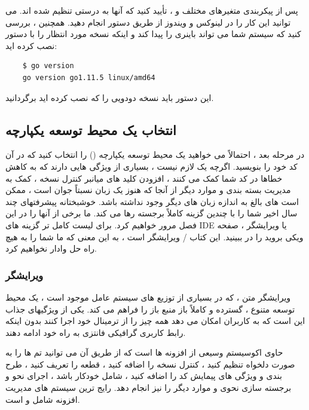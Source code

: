 \documentclass[12pt]{book}
\begin{document}
پس از پیکربندی متغیرهای مختلف  و  ، تأیید کنید که آنها به درستی تنظیم شده اند.
می توانید این کار را در لینوکس و ویندوز از طریق دستور  انجام دهید.
همچنین ، بررسی کنید که سیستم شما می تواند باینری را پیدا کند و اینکه نسخه مورد انتظار  را با دستور نصب کرده اید:
\begin{latin}
	\begin{lstlisting}
	$ go version
	go version go1.11.5 linux/amd64
	\end{lstlisting}
\end{latin}
این دستور باید نسخه دودویی را که نصب کرده اید برگردانید.
\subsection{انتخاب یک محیط توسعه یکپارچه}
در مرحله بعد ، احتمالاً می خواهید یک محیط توسعه یکپارچه () را انتخاب کنید که در آن کد خود را بنویسید.
اگرچه یک  لازم نیست ، بسیاری از ویژگی هایی دارند که به کاهش خطاها در کد شما کمک می کنند ، افزودن کلید های میانبر کنترل نسخه ، کمک به مدیریت بسته بندی و موارد دیگر
از آنجا که  هنوز یک زبان نسبتاً جوان است ، ممکن است  های بالغ به اندازه زبان های دیگر وجود نداشته باشد.
خوشبختانه پیشرفتهای چند سال اخیر شما را با چندین گزینه کاملاً برجسته رها می کند.
ما برخی از آنها را در این فصل مرور خواهیم کرد.
برای لیست کامل تر گزینه های IDE یا ویرایشگر ، صفحه ویکی بروید را در ببینید.
این کتاب  / ویرایشگر  است ، به این معنی که ما شما را به هیچ راه حل وادار نخواهیم کرد.
\subsubsection{ویرایشگر }
ویرایشگر متن  ، که در بسیاری از توزیع های سیستم عامل موجود است ، یک محیط توسعه متنوع ، گسترده و کاملاً باز منبع باز را فراهم می کند.
یکی از ویژگیهای جذاب  این است که به کاربران امکان می دهد همه چیز را از ترمینال خود اجرا کنند بدون اینکه رابط کاربری گرافیکی فانتزی به راه خود ادامه دهند.

 حاوی اکوسیستم وسیعی از افزونه ها است که از طریق آن می توانید تم ها را به صورت دلخواه تنظیم کنید ، کنترل نسخه را اضافه کنید ، قطعه را تعریف کنید ، طرح بندی و ویژگی های پیمایش کد را اضافه کنید ، شامل خودکار باشد ، اجرای نحو و برجسته سازی نحوی و موارد دیگر را نیز انجام دهد.
رایج ترین سیستم های مدیریت افزونه  شامل  و  است.
\end{document}
